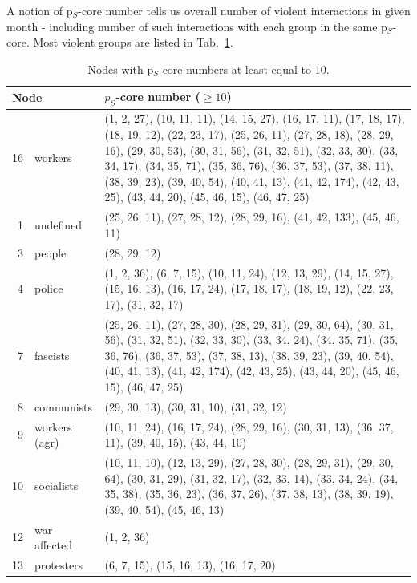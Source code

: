 \documentclass[a4paper,twoside,10pt]{article}
\begin{document}
A notion of p$_S$-core number tells us overall number of violent interactions in given month - including number of such interactions with each group in the same p$_S$-core. Most violent groups are listed in Tab.~\ref{violencecore10}.

\begin{center}
\begin{longtable}{rlp{8.5cm}}
\caption{Nodes with p$_S$-core numbers at least equal to $10.$}
\label{violencecore10}\\
 \multicolumn{2}{l}{\textbf{Node}} & \textbf{$p_S$-core number} ($\geq 10$)\\
 \endhead
 16 & workers      &(1, 2, 27), (10, 11, 11), (14, 15, 27), (16, 17, 11), (17, 18, 17), (18, 19, 12), (22, 23, 17), (25, 26, 11), (27, 28, 18), (28, 29, 16), (29, 30, 53), (30, 31, 56), (31, 32, 51), (32, 33, 30), 
(33, 34, 17), (34, 35, 71), (35, 36, 76), (36, 37, 53), (37, 38, 11), (38, 39, 23), (39, 40, 54), (40, 41, 13), (41, 42, 174), (42, 43, 25), (43, 44, 20), (45, 46, 15), (46, 47, 25)\\
  1 & undefined    &(25, 26, 11), (27, 28, 12), (28, 29, 16), (41, 42, 133), (45, 46, 11)\\
  3 & people       &(28, 29, 12)\\
  4 & police       &(1, 2, 36), (6, 7, 15), (10, 11, 24), (12, 13, 29), (14, 15, 27), (15, 16, 13), (16, 17, 24), (17, 18, 17), (18, 19, 12), (22, 23, 17), (31, 32, 17)\\
  7 & fascists     &(25, 26, 11), (27, 28, 30), (28, 29, 31), (29, 30, 64), (30, 31, 56), (31, 32, 51), (32, 33, 30), (33, 34, 24), (34, 35, 71), (35, 36, 76), (36, 37, 53), (37, 38, 13), (38, 39, 23), (39, 40, 54), (40, 41, 13), (41, 42, 174), (42, 43, 25), (43, 44, 20), (45, 46, 15), (46, 47, 25)\\
  8 & communists   &(29, 30, 13), (30, 31, 10), (31, 32, 12)\\
  9 & workers (agr)&(10, 11, 24), (16, 17, 24), (28, 29, 16), (30, 31, 13), (36, 37, 11), (39, 40, 15), (43, 44, 10)\\
 10 & socialists   &(10, 11, 10), (12, 13, 29), (27, 28, 30), (28, 29, 31), (29, 30, 64), (30, 31, 29), (31, 32, 17), (32, 33, 14), (33, 34, 24), (34, 35, 38), (35, 36, 23), (36, 37, 26), (37, 38, 13), (38, 39, 19),
         (39, 40, 54), (45, 46, 13)\\
 12 & war affected  &(1, 2, 36)\\
 13 & protesters   &(6, 7, 15), (15, 16, 13), (16, 17, 20)
\end{longtable}
\end{center}
\end{document}
